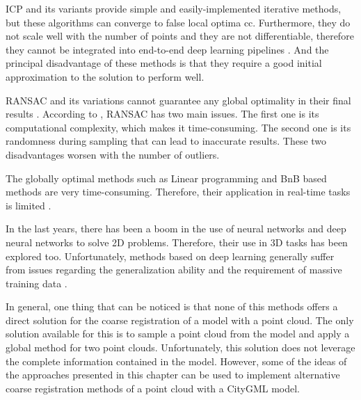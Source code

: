     ICP and its variants provide simple and easily-implemented iterative methods, but these algorithms can converge to false local optima cc.
    Furthermore, they do not scale well with the number of points and they are not differentiable, therefore they cannot be integrated into end-to-end
    deep learning pipelines \cite{Sarode_2019_oneframework}. 
    And the principal disadvantage of these methods is that they require a good initial approximation to the solution to perform well.
    
    RANSAC and its variations cannot guarantee any global optimality in their final results \cite{Bazin_2013_abranchandbound}.
    According to \cite{Quan_2020_com}, RANSAC has two main issues. 
    The first one is its computational complexity, which makes it time-consuming.
    The second one is its randomness during sampling that can lead to inaccurate results.
    These two disadvantages worsen with the number of outliers.

    The globally optimal methods such as Linear programming and BnB based methods are very time-consuming. 
    Therefore, their application in real-time tasks is limited \cite{Sarode_2019_oneframework}.

    In the last years, there has been a boom in the use of neural networks and deep neural networks to solve 2D problems.
    Therefore, their use in 3D tasks has been explored too.
    Unfortunately, methods based on deep learning generally suffer from issues regarding the generalization ability and the requirement of massive training data \cite{Quan_2020_com}.

    In general, one thing that can be noticed is that none of this methods offers a direct solution for the coarse registration of a model with a point cloud.
    The only solution available for this is to sample a point cloud from the model and apply a global method for two point clouds.
    Unfortunately, this solution does not leverage the complete information contained in the model.
    However, some of the ideas of the approaches presented in this chapter can be used to implement alternative coarse registration methods of a point cloud with a CityGML model.


